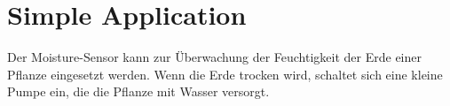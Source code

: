 \section{Simple Application}

Der Moisture-Sensor kann zur Überwachung der Feuchtigkeit der Erde einer Pflanze eingesetzt werden. Wenn die Erde trocken wird, schaltet sich eine kleine Pumpe ein, die die Pflanze mit Wasser versorgt.

{
	
}



